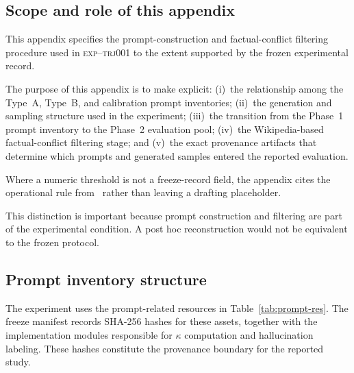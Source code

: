 \documentclass{article}
\newcommand{\exptag}{\textsc{exp--trj001}}
\begin{document}
\subsection{Scope and role of this appendix}
\label{app:b-scope}

This appendix specifies the prompt-construction and factual-conflict filtering procedure used in \exptag{} to the extent supported by the frozen experimental record.

The purpose of this appendix is to make explicit:
(i)~the relationship among the Type~A, Type~B, and calibration prompt inventories;
(ii)~the generation and sampling structure used in the experiment;
(iii)~the transition from the Phase~1 prompt inventory to the Phase~2 evaluation pool;
(iv)~the Wikipedia-based factual-conflict filtering stage; and
(v)~the exact provenance artifacts that determine which prompts and generated samples entered the reported evaluation.

Where a numeric threshold is not a freeze-record field, the appendix cites the operational rule from~\citet{exptrj001plan} rather than leaving a drafting placeholder.

This distinction is important because prompt construction and filtering are part of the experimental condition. A post hoc reconstruction would not be equivalent to the frozen protocol.

\subsection{Prompt inventory structure}
\label{app:b-inv}

The experiment uses the prompt-related resources in Table~\ref{tab:prompt-res}.
The freeze manifest records {SHA-256} hashes for these assets, together with the implementation modules responsible for $\kappa$ computation and hallucination labeling. These hashes constitute the provenance boundary for the reported study.
\end{document}

